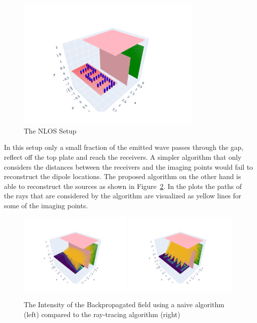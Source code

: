 \begin{figure}[ht]
    \centering
    \includegraphics[width=0.8\textwidth]{figures/nlos_setup.pdf}
    \caption{The NLOS Setup}\label{fig:nlos_setup}
\end{figure}

In this setup only a small fraction of the emitted wave passes through the gap, reflect off the top plate and reach the receivers.
A simpler algorithm that only considers the distances between the receivers and the imaging points would fail to reconstruct the dipole locations.
The proposed algorithm on the other hand is able to reconstruct the sources as shown in Figure~\ref{fig:nlos_results}.
In the plots the paths of the rays that are considered by the algorithm are visualized as yellow lines for some of the imaging points.

\begin{figure}[ht]
    \centering
    \includegraphics[width=0.49\textwidth]{figures/nlos_naive_result.pdf}
    \includegraphics[width=0.49\textwidth]{figures/nlos_result.pdf}
    \caption{The Intensity of the Backpropagated field using a naive algorithm (left) compared to the ray-tracing algorithm (right)}\label{fig:nlos_results}
\end{figure}

